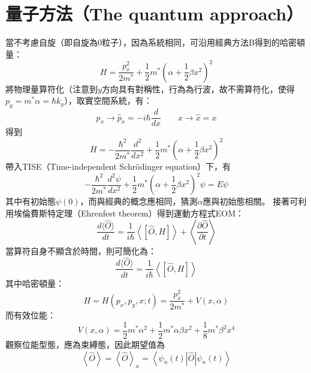 \documentclass[12pt]{article}
\begin{document}
\section{量子方法（The quantum approach）}
當不考慮自旋（即自旋為0粒子），因為系統相同，可沿用經典方法B得到的哈密頓量：
\begin{equation}
    H=\frac{p_x^2}{2m^*}+\frac{1}{2}m^*\left(\alpha+\frac12\beta x^2\right)^2
\end{equation}
將物理量算符化（注意到$y$方向具有對稱性，行為為行波，故不需算符化，使得$p_y=m^*\alpha=\hbar k_y$），取實空間系統，有：
\begin{equation}
    p_x\to\hat{p}_x=-i\hbar\frac{d}{dx}\qquad x\to \hat{x}=x
\end{equation}
得到
\begin{equation}
    H=-\frac{\hbar^2}{2m^*}\frac{d^2}{dx^2}+\frac{1}{2}m^*\left(\alpha+\frac12\beta x^2\right)^2
\end{equation}
帶入TISE（Time-independent Schrödinger equation）下，有
\begin{equation}
    -\frac{\hbar^2}{2m^*}\frac{d^2\psi}{dx^2}+\frac{1}{2}m^*\left(\alpha+\frac12\beta x^2\right)^2\psi=E\psi\label{29}
\end{equation}
其中有初始態$\psi(0)$，而與經典的概念應相同，猜測$\alpha$應與初始態相關。
\newline
接著可利用埃倫費斯特定理（Ehrenfest theorem）得到運動方程式EOM：
\begin{equation}
    \frac{d\langle\hat{O}\rangle}{dt}=\frac{1}{i\hbar}\left\langle\left[\hat{O},H\right]\right\rangle+\left\langle\frac{\partial\hat{O}}{\partial t}\right\rangle
\end{equation}
當算符自身不顯含於時間，則可簡化為：
\begin{equation}
    \frac{d\langle\hat{O}\rangle}{dt}=\frac{1}{i\hbar}\left\langle\left[\hat{O},H\right]\right\rangle
\end{equation}
其中哈密頓量：
\begin{equation}
     H=H(p_x,p_y,x;t)=\frac{p_x^2}{2m^*}+V(x,\alpha)
\end{equation}
而有效位能：
\begin{equation}
    V(x,\alpha)=\frac{1}{2}m^*\alpha^2 + \frac{1}{2}m^*\alpha\beta x^2 + \frac{1}{8}m^*\beta^2 x^4
\end{equation}
觀察位能型態，應為束縛態，因此期望值為
\begin{equation}
    \left\langle\hat{O}\right\rangle=\left\langle\hat{O}\right\rangle_n=\left\langle\psi_n(t)\left|\hat{O}\right|\psi_n(t)\right\rangle
\end{equation}
\end{document}
